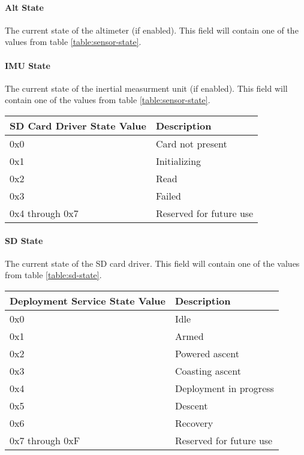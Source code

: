 \paragraph{Alt State}
The current state of the altimeter (if enabled). This field will contain one of
the values from table \ref{table:sensor-state}.

\paragraph{IMU State}
The current state of the inertial measurment unit (if enabled). This field will
contain one of the values from table \ref{table:sensor-state}.

\begin{table*}[htb]
\centering
\begin{tabular}{@{}ll@{}}
\toprule
SD Card Driver State Value  &   Description \\
\midrule
0x0                         &   Card not present \\
0x1                         &   Initializing \\
0x2                         &   Read \\
0x3                         &   Failed \\
0x4 through 0x7             &   Reserved for future use \\
\bottomrule
\end{tabular}
\caption{SD Card Driver States}
\label{table:sd-state}
\end{table*}

\paragraph{SD State}
The current state of the SD card driver. This field will contain one of the
values from table \ref{table:sd-state}.

\begin{table*}[htb]
\centering
\begin{tabular}{@{}ll@{}}
\toprule
Deployment Service State Value  &   Description \\
\midrule
0x0                             &   Idle \\
0x1                             &   Armed \\
0x2                             &   Powered ascent \\
0x3                             &   Coasting ascent \\
0x4                             &   Deployment in progress \\
0x5                             &   Descent \\
0x6                             &   Recovery \\
0x7 through 0xF                 &   Reserved for future use \\
\bottomrule
\end{tabular}
\caption{Deployment Service States}
\label{table:deployment-state}
\end{table*}

